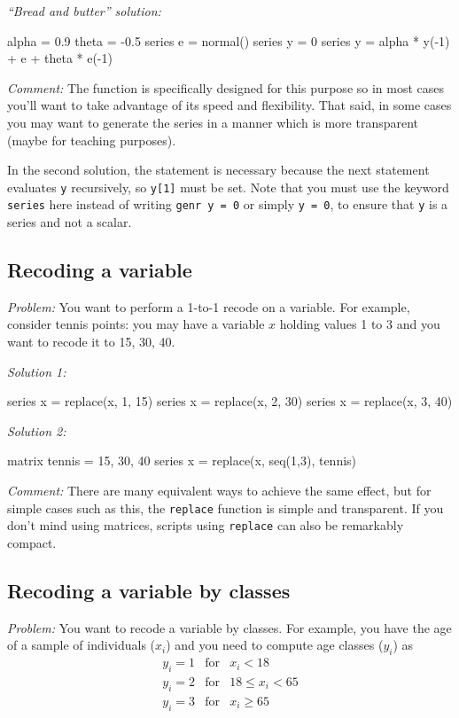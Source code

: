 \emph{``Bread and butter'' solution:}
\begin{code}
alpha = 0.9
theta = -0.5
series e = normal()
series y = 0
series y = alpha * y(-1) + e + theta * e(-1)
\end{code}

\emph{Comment:} The  function is specifically designed for
this purpose so in most cases you'll want to take advantage of its
speed and flexibility. That said, in some cases you may want to
generate the series in a manner which is more transparent (maybe for
teaching purposes). 

In the second solution, the statement  is necessary
because the next statement evaluates \texttt{y} recursively, so
\texttt{y[1]} must be set.  Note that you must use the keyword
\texttt{series} here instead of writing \texttt{genr y = 0} or simply
\texttt{y = 0}, to ensure that \texttt{y} is a series and
not a scalar.

\subsection{Recoding a variable}

\emph{Problem:} You want to perform a 1-to-1 recode on a variable. For
example, consider tennis points: you may have a variable $x$ holding
values 1 to 3 and you want to recode it to 15, 30, 40. 

\emph{Solution 1:}
\begin{code}
series x = replace(x, 1, 15)
series x = replace(x, 2, 30)
series x = replace(x, 3, 40)
\end{code}

\emph{Solution 2:}
\begin{code}
matrix tennis = {15, 30, 40}
series x = replace(x, seq(1,3), tennis)
\end{code}

\emph{Comment:} There are many equivalent ways to achieve the same
effect, but for simple cases such as this, the \texttt{replace}
function is simple and transparent. If you don't mind using matrices,
scripts using \texttt{replace} can also be remarkably compact.

\subsection{Recoding a variable by classes}

\emph{Problem:} You want to recode a variable by classes. For example,
you have the age of a sample of individuals ($x_i$) and you need to
compute age classes ($y_i$) as
\begin{eqnarray*}
  y_i = 1 & \mathrm{for} & x_i < 18 \\
  y_i = 2 & \mathrm{for} & 18 \le x_i < 65 \\
  y_i = 3 & \mathrm{for} & x_i \ge 65
\end{eqnarray*}

